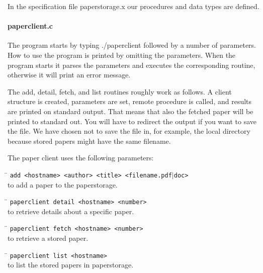 \documentclass[a4paper,10pt]{article}
\begin{document}
In the specification file paperstorage.x our procedures and data types are defined.

\paragraph{paperclient.c}
The program starts by typing ./paperclient followed by a number of parameters. How to use the program is printed by omitting the parameters. When the program starts it parses the parameters and executes the corresponding routine, otherwise it will print an error message.

The add, detail, fetch, and list routines roughly work as follows. A client structure is created, parameters are set, remote procedure is called, and results are printed on standard output. That means that also the fetched paper will be printed to standard out. You will have to redirect the output if you want to save the file. We have chosen not to save the file in, for example, the local directory because stored papers might have the same filename.

The paper client uses the following parameters:

\begin{tabbing}
\hspace{20pt}\=\kill
 \> \texttt{add <hostname> <author> <title> <filename.}{\texttt{pdf$\vert$doc}}\texttt{>} \\
 \> to add a paper to the paperstorage.
\end{tabbing}

\begin{tabbing}
\hspace{20pt}\=\kill
 \> \texttt{paperclient detail <hostname> <number>} \\
 \> to retrieve details about a specific paper.
\end{tabbing}

\begin{tabbing}
\hspace{20pt}\=\kill
 \> \texttt{paperclient fetch <hostname> <number>} \\
 \> to retrieve a stored paper.
\end{tabbing}

\begin{tabbing}
\hspace{20pt}\=\kill
 \> \texttt{paperclient list <hostname>} \\
 \> to list the stored papers in paperstorage.
\end{tabbing}
\end{document}

